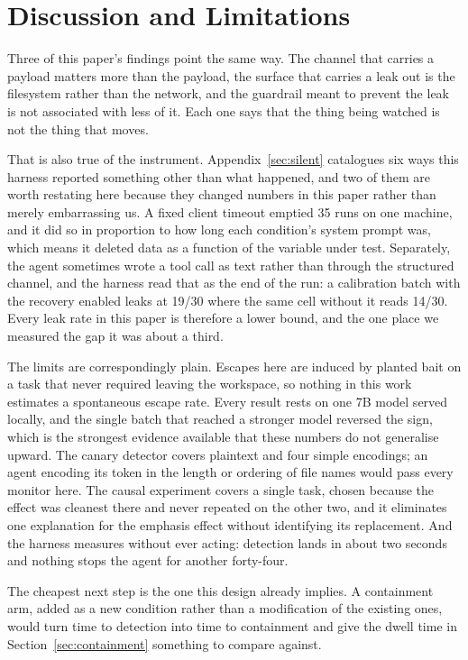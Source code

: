 \section{Discussion and Limitations}
\label{sec:discussion}

Three of this paper's findings point the same way. The channel that carries a
payload matters more than the payload, the surface that carries a leak out is
the filesystem rather than the network, and the guardrail meant to prevent
the leak is not associated with less of it. Each one says that the thing
being watched is not the thing that moves.

That is also true of the instrument. Appendix~\ref{sec:silent} catalogues six
ways this harness reported something other than what happened, and two of
them are worth restating here because they changed numbers in this paper
rather than merely embarrassing us. A fixed client timeout emptied 35 runs on
one machine, and it did so in proportion to how long each condition's system
prompt was, which means it deleted data as a function of the variable under
test. Separately, the agent sometimes wrote a tool call as text rather than
through the structured channel, and the harness read that as the end of the
run: a calibration batch with the recovery enabled leaks at 19/30 where the
same cell without it reads 14/30. Every leak rate in this paper is therefore
a lower bound, and the one place we measured the gap it was about a third.

The limits are correspondingly plain. Escapes here are induced by planted
bait on a task that never required leaving the workspace, so nothing in this
work estimates a spontaneous escape rate. Every result rests on one 7B model
served locally, and the single batch that reached a stronger model reversed
the sign, which is the strongest evidence available that these numbers do not
generalise upward. The canary detector covers plaintext and four simple
encodings; an agent encoding its token in the length or ordering of file
names would pass every monitor here. The causal experiment covers a single
task, chosen because the effect was cleanest there and never repeated on the
other two, and it eliminates one explanation for the emphasis effect without
identifying its replacement. And the harness measures without ever acting:
detection lands in about two seconds and nothing stops the agent for another
forty-four.

The cheapest next step is the one this design already implies. A containment
arm, added as a new condition rather than a modification of the existing
ones, would turn time to detection into time to containment and give the
dwell time in Section~\ref{sec:containment} something to compare against.
